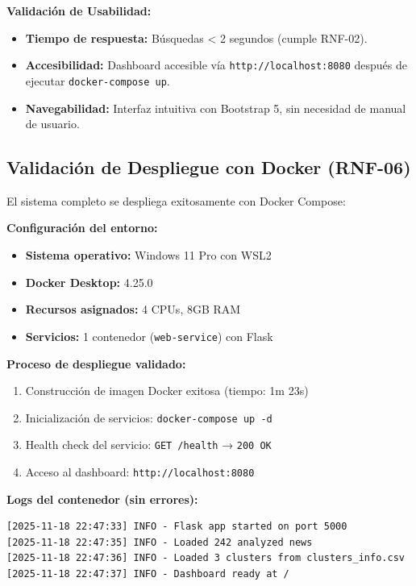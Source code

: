 \textbf{Validación de Usabilidad:}
\begin{itemize}
    \item \textbf{Tiempo de respuesta:} Búsquedas < 2 segundos (cumple RNF-02).
    \item \textbf{Accesibilidad:} Dashboard accesible vía \texttt{http://localhost:8080} después de ejecutar \texttt{docker-compose up}.
    \item \textbf{Navegabilidad:} Interfaz intuitiva con Bootstrap 5, sin necesidad de manual de usuario.
\end{itemize}

\subsection{Validación de Despliegue con Docker (RNF-06)}
\label{subsec:resultados_docker}

El sistema completo se despliega exitosamente con Docker Compose:

\textbf{Configuración del entorno:}
\begin{itemize}
    \item \textbf{Sistema operativo:} Windows 11 Pro con WSL2
    \item \textbf{Docker Desktop:} 4.25.0
    \item \textbf{Recursos asignados:} 4 CPUs, 8GB RAM
    \item \textbf{Servicios:} 1 contenedor (\texttt{web-service}) con Flask
\end{itemize}

\textbf{Proceso de despliegue validado:}
\begin{enumerate}
    \item Construcción de imagen Docker exitosa (tiempo: 1m 23s)
    \item Inicialización de servicios: \texttt{docker-compose up -d}
    \item Health check del servicio: \texttt{GET /health} → \texttt{200 OK}
    \item Acceso al dashboard: \texttt{http://localhost:8080}
\end{enumerate}

\textbf{Logs del contenedor (sin errores):}
\begin{verbatim}
[2025-11-18 22:47:33] INFO - Flask app started on port 5000
[2025-11-18 22:47:35] INFO - Loaded 242 analyzed news
[2025-11-18 22:47:36] INFO - Loaded 3 clusters from clusters_info.csv
[2025-11-18 22:47:37] INFO - Dashboard ready at /
\end{verbatim}

